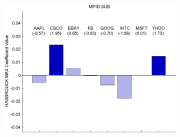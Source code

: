 \documentclass{article}
\begin{document}
\begin{figure}[htp!]
\begin{subfigure}{0.31\textwidth}
\includegraphics[width=\linewidth]{docs/Regression_Ratio_30sec_1_HASBROUCK_MAX.pdf}
\end{subfigure}

\begin{minipage}{\textwidth}
\footnotesize
\end{minipage}
\end{figure}
\end{document}
